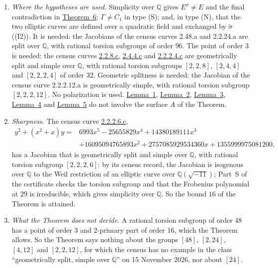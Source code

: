 \documentclass[11pt]{article}
\newcommand{\Q}{\mathbb Q}
\begin{document}
\begin{enumerate}
\item\label{rem-where} \emph{Where the hypotheses are used.} Simplicity over \(\Q\) gives \(E^\sigma\neq E\) and
the final contradiction in \hyperref[thm-quadratic]{Theorem~6}; \(\Gamma\neq C_1\) in type (S); and, in type (N),
that the two elliptic curves are defined over a quadratic field and exchanged by \(\tilde\sigma\) ((I2)). It is
needed:
the Jacobians of the census curves 2.48.a and 2.2.24.a are split over \(\Q\), with rational torsion subgroups of
order \(96\). The point of order \(3\) is needed: the census curves
\href{https://genus-2-torsion.github.io/curve.html?id=2.2.8.c}{2.2.8.c},
\href{https://genus-2-torsion.github.io/curve.html?id=2.4.4.c}{2.4.4.c} and
\href{https://genus-2-torsion.github.io/curve.html?id=2.2.2.4.c}{2.2.2.4.c} are geometrically split and simple
over \(\Q\), with rational torsion subgroups \([2,2,8]\), \([2,4,4]\) and \([2,2,2,4]\) of order \(32\). Geometric
splitness is needed: the Jacobian of the census curve 2.2.2.12.a is geometrically simple, with rational torsion
subgroup \([2,2,2,12]\). No polarization is used. \hyperref[lemma-five]{Lemma~1},
\hyperref[lemma-curve]{Lemma~2}, \hyperref[lemma-basechange]{Lemma~3}, \hyperref[lemma-split]{Lemma~4} and
\hyperref[lemma-combine]{Lemma~5} do not involve the surface \(A\) of the Theorem.

\item\label{rem-sharp} \emph{Sharpness.} The census curve
\href{https://genus-2-torsion.github.io/curve.html?id=2.2.2.6.c}{2.2.2.6.c},
\[\begin{aligned}y^2+(x^2+x)y={}&6993x^5-25655829x^4+14380189111x^3\\
&+16095094765893x^2+2757085929534360x+1355999975081200,\end{aligned}\]
has a Jacobian that is geometrically split and simple over \(\Q\), with rational torsion subgroup \([2,2,2,6]\):
by its census record, the Jacobian is isogenous over \(\Q\) to the Weil restriction of an elliptic curve over
\(\Q(\sqrt{-11})\); Part~S of the certificate checks the torsion subgroup and that the Frobenius polynomial at
\(29\) is irreducible, which gives simplicity over \(\Q\). So the bound \(16\) of the Theorem is attained.

\item\label{rem-open} \emph{What the Theorem does not decide.} A rational torsion subgroup of order \(48\) has a
point of order \(3\) and \(2\)-primary part of order \(16\), which the Theorem allows. So the Theorem says nothing
about the groups \([48]\), \([2,24]\), \([4,12]\) and \([2,2,12]\), for which the census has no example in the
class ``geometrically split, simple over \(\Q\)'' on 15 November 2026, nor about \([24]\).


\end{enumerate}
\end{document}
